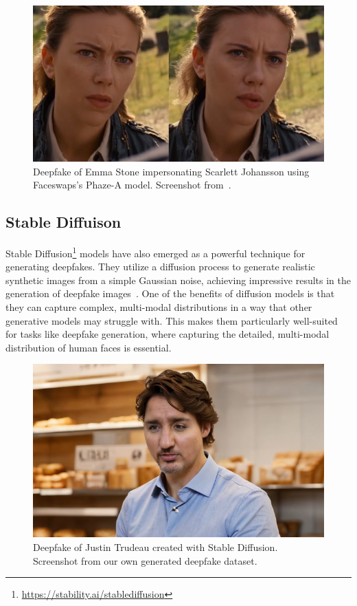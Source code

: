 \begin{figure}[ht]
	\centering
	\includegraphics[scale=0.32]{figures/emma-stone-faceswap}
	\caption{Deepfake of Emma Stone impersonating Scarlett Johansson using
		Faceswaps's Phaze-A model. Screenshot from~\cite{emma-stone-faceswap}.}
\end{figure}

\subsection{Stable Diffuison}\label{sec:stable-diffusion}
Stable Diffusion\footnote{\url{https://stability.ai/stablediffusion}} models have
also emerged as a powerful technique for generating deepfakes.
They utilize a diffusion process to generate realistic synthetic images from a
simple Gaussian noise, achieving impressive results in the generation of
deepfake images~\cite{wu2022unifying}. One of the benefits of diffusion models
is that they can capture complex, multi-modal distributions in a way that
other generative models may struggle with. This makes them particularly
well-suited for tasks like deepfake generation, where capturing the
detailed, multi-modal distribution of human faces is essential.

\begin{figure}[ht]
	\centering
	\includegraphics[width=0.59\columnwidth]{figures/justion-trudeau-stable-diff}
	\caption{Deepfake of Justin Trudeau created with Stable Diffusion.
		Screenshot from our own generated deepfake dataset.} %
\end{figure}

